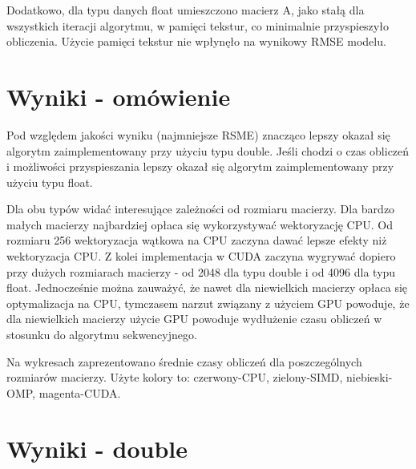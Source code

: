 \documentclass[11pt,a4paper]{article}
\begin{document}
Dodatkowo, dla typu danych float umieszczono macierz A, jako stałą dla wszystkich iteracji algorytmu, w pamięci tekstur, co minimalnie przyspieszyło obliczenia. Użycie pamięci tekstur nie wpłynęło na wynikowy RMSE modelu.

\section{Wyniki - omówienie}
Pod względem jakości wyniku (najmniejsze RSME) znacząco lepszy okazał się algorytm zaimplementowany przy użyciu typu double. Jeśli chodzi o czas obliczeń i możliwości przyspieszania lepszy okazał się algorytm zaimplementowany przy użyciu typu float.

Dla obu typów widać interesujące zależności od rozmiaru macierzy. Dla bardzo małych macierzy najbardziej opłaca się wykorzystywać wektoryzację CPU. Od rozmiaru 256 wektoryzacja wątkowa na CPU zaczyna dawać lepsze efekty niż wektoryzacja CPU. Z kolei implementacja w CUDA zaczyna wygrywać dopiero przy dużych rozmiarach macierzy - od 2048 dla typu double i od 4096 dla typu float. Jednocześnie można zauważyć, że nawet dla niewielkich macierzy opłaca się optymalizacja na CPU, tymczasem narzut związany z użyciem GPU powoduje, że dla niewielkich macierzy użycie GPU powoduje wydłużenie czasu obliczeń w stosunku do algorytmu sekwencyjnego.

Na wykresach zaprezentowano średnie czasy obliczeń dla poszczególnych rozmiarów macierzy. Użyte kolory to: czerwony-CPU, zielony-SIMD, niebieski-OMP, magenta-CUDA.

\newpage
\section{Wyniki - double}
\end{document}
